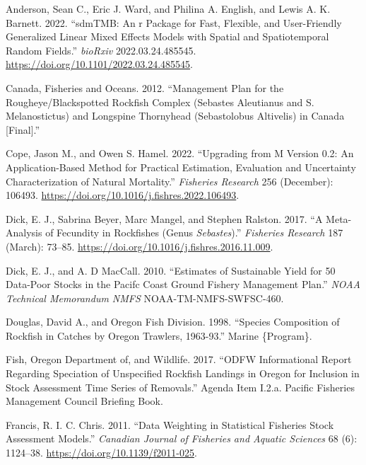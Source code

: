 \documentclass[
]{scrartcl}
\newlength{\cslhangindent}
\newenvironment{CSLReferences}[2] %
 {\begin{list}{}{%
  \setlength{\itemindent}{0pt}
  \setlength{\leftmargin}{0pt}
  \setlength{\parsep}{0pt}
  \ifodd #1
   \setlength{\leftmargin}{\cslhangindent}
   \setlength{\itemindent}{-1\cslhangindent}
  \fi
  \setlength{\itemsep}{#2\baselineskip}}}
 {\end{list}}
\begin{document}
\label{refs}
\begin{CSLReferences}{1}{0}
Anderson, Sean C., Eric J. Ward, and Philina A. English, and Lewis A. K.
Barnett. 2022. {``{sdmTMB}: An r Package for Fast, Flexible, and
User-Friendly Generalized Linear Mixed Effects Models with Spatial and
Spatiotemporal Random Fields.''} \emph{bioRxiv} 2022.03.24.485545.
\url{https://doi.org/10.1101/2022.03.24.485545}.

Canada, Fisheries and Oceans. 2012. {``Management {Plan} for the
{Rougheye}/{Blackspotted} {Rockfish} {Complex} ({Sebastes} Aleutianus
and {S}. Melanostictus) and {Longspine} {Thornyhead} ({Sebastolobus}
Altivelis) in {Canada} {[}{Final}{]}.''}

Cope, Jason M., and Owen S. Hamel. 2022. {``Upgrading from {M} Version
0.2: {An} Application-Based Method for Practical Estimation, Evaluation
and Uncertainty Characterization of Natural Mortality.''}
\emph{Fisheries Research} 256 (December): 106493.
\url{https://doi.org/10.1016/j.fishres.2022.106493}.

Dick, E. J., Sabrina Beyer, Marc Mangel, and Stephen Ralston. 2017. {``A
Meta-Analysis of Fecundity in Rockfishes (Genus \emph{Sebastes}).''}
\emph{Fisheries Research} 187 (March): 73--85.
\url{https://doi.org/10.1016/j.fishres.2016.11.009}.

Dick, E. J., and A. D MacCall. 2010. {``Estimates of Sustainable Yield
for 50 Data-Poor Stocks in the {Pacifc} Coast Ground {Fishery}
{Management} {Plan}.''} \emph{NOAA Technical Memorandum NMFS}
NOAA-TM-NMFS-SWFSC-460.

Douglas, David A., and Oregon Fish Division. 1998. {``Species
Composition of Rockfish in Catches by {Oregon} Trawlers, 1963-93.''}
Marine \{Program\}.

Fish, Oregon Department of, and Wildlife. 2017. {``ODFW Informational
Report Regarding Speciation of Unspecified Rockfish Landings in Oregon
for Inclusion in Stock Assessment Time Series of Removals.''} Agenda
Item I.2.a. Pacific Fisheries Management Council Briefing Book.

Francis, R. I. C. Chris. 2011. {``Data Weighting in Statistical
Fisheries Stock Assessment Models.''} \emph{Canadian Journal of
Fisheries and Aquatic Sciences} 68 (6): 1124--38.
\url{https://doi.org/10.1139/f2011-025}.


\end{CSLReferences}
\end{document}
